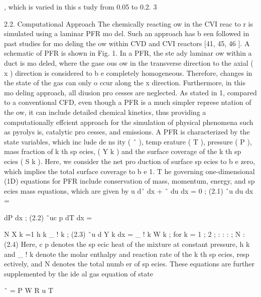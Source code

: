 \documentclass[10pt, letterpaper]{article}
\begin{document}
, which is varied in this s tudy from 0.05 to 0.2.
3


2.2. Computational Approach
The chemically reacting 
ow in the CVI reac to r is simulated using a laminar PFR mo del. Such an
approach has b een followed in past studies for mo deling the 
ow within CVD and CVI reactors [41, 45, 46 ].
A schematic of PFR is shown in Fig. 1. In a PFR, the ste ady laminar 
ow within a duct is mo deled,
where the gase ous 
ow in the transverse direction to the axial (
x
) direction is considered to b e completely
homogeneous. Therefore, changes in the state of the gas can only o ccur along the
x
direction. Furthermore,
in this mo deling approach, all diusion pro cesses are neglected. As stated in 1, compared to a conventional
CFD, even though a PFR is a much simpler represe ntation of the 
ow, it can include detailed chemical
kinetics, thus providing a computationally effcient approach for the simulation of physical phenomena such
as pyrolys is, catalytic pro cesses, and emissions.
A PFR is characterized by the state variables, which inc lude de ns ity (
ˆ
), temp erature (
T
), pressure (
P
),
mass fraction of
k
th
sp ecies, (
Y
k
) and the surface coverage of the
k
th
sp ecies (
S
k
). Here, we consider the
net pro duction of surface sp ecies to b e zero, which implies the total surface coverage to b e 1. T he governing
one-dimensional (1D) equations for PFR include conservation of mass, momentum, energy, and sp ecies mass
equations, which are given by
u
dˆ
dx
+
ˆ
du
dx
= 0
;
(2.1)
ˆu
du
dx
=

dP
dx
;
(2.2)
ˆuc
p
dT
dx
=

N
X
k
=1
h
k
\_
!
k
;
(2.3)
ˆu
d Y
k
dx
= \_
!
k
W
k
;
for
k
= 1
;
2
; : : : ; N :
(2.4)
Here,
c
p
denotes the sp ecic heat of the mixture at constant pressure,
h
k
and \_
!
k
denote the molar enthalpy
and reaction rate of the
k
th
sp ecies, resp ectively, and
N
denotes the total numb er of sp ecies. These equations
are further supplemented by the ide al gas equation of state

ˆ
=
P
W
R
u
T
\end{document}
